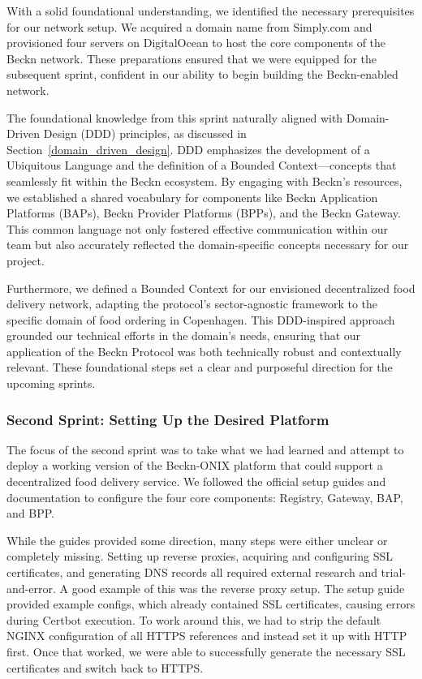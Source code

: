 With a solid foundational understanding, we identified the necessary prerequisites for our network setup. We acquired a domain name from Simply.com and provisioned four servers on DigitalOcean to host the core components of the Beckn network. These preparations ensured that we were equipped for the subsequent sprint, confident in our ability to begin building the Beckn-enabled network.

The foundational knowledge from this sprint naturally aligned with Domain-Driven Design (DDD) principles, as discussed in Section~\ref{domain_driven_design}. DDD emphasizes the development of a Ubiquitous Language and the definition of a Bounded Context—concepts that seamlessly fit within the Beckn ecosystem. By engaging with Beckn’s resources, we established a shared vocabulary for components like Beckn Application Platforms (BAPs), Beckn Provider Platforms (BPPs), and the Beckn Gateway. This common language not only fostered effective communication within our team but also accurately reflected the domain-specific concepts necessary for our project.

Furthermore, we defined a Bounded Context for our envisioned decentralized food delivery network, adapting the protocol’s sector-agnostic framework to the specific domain of food ordering in Copenhagen. This DDD-inspired approach grounded our technical efforts in the domain’s needs, ensuring that our application of the Beckn Protocol was both technically robust and contextually relevant. These foundational steps set a clear and purposeful direction for the upcoming sprints.
\subsubsection{Second Sprint: Setting Up the Desired Platform}
\label{second_sprint}
The focus of the second sprint was to take what we had learned and attempt to deploy a working version of the Beckn-ONIX platform that could support a decentralized food delivery service. We followed the official setup guides and documentation to configure the four core components: Registry, Gateway, BAP, and BPP. 

While the guides provided some direction, many steps were either unclear or completely missing. Setting up reverse proxies, acquiring and configuring SSL certificates, and generating DNS records all required external research and trial-and-error. A good example of this was the reverse proxy setup. The setup guide provided example configs, which already contained SSL certificates, causing errors during Certbot execution. To work around this, we had to strip the default NGINX configuration of all HTTPS references and instead set it up with HTTP first. Once that worked, we were able to successfully generate the necessary SSL certificates and switch back to HTTPS.


